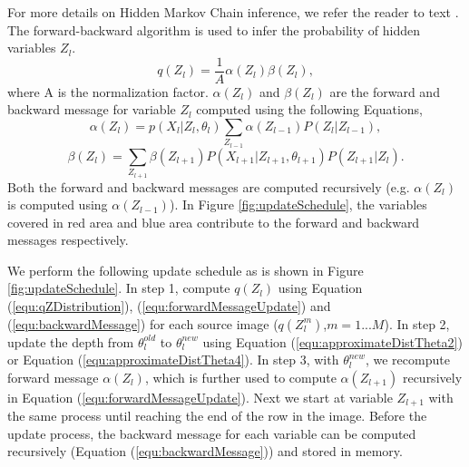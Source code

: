 For more details on Hidden Markov Chain inference, we refer the reader to text \cite{BishopBook}. The forward-backward algorithm is used to infer the probability of hidden variables $Z_l$.
\begin{equation}
q(Z_l) = \frac{1}{A}\alpha(Z_l)\beta(Z_l),
\label{equ:qZDistribution}
\end{equation}
where A is the normalization factor. $\alpha(Z_l)$ and $\beta(Z_l)$ are the forward and backward message for variable $Z_l$ computed using the following Equations,
\begin{equation}
\alpha(Z_l) = p(X_l|Z_l, \theta_l)\sum_{Z_{l-1}}{\alpha(Z_{l-1})P(Z_l|Z_{l-1})},
\label{equ:forwardMessageUpdate}
\end{equation}
\begin{equation}
\beta(Z_l)=\sum_{Z_{l+1}}\beta(Z_{l+1})P(X_{l+1}|Z_{l+1}, \theta_{l+1})P(Z_{l+1}|Z_{l}).
\label{equ:backwardMessage}
\end{equation}
Both the forward and backward messages are computed recursively (e.g.  $\alpha(Z_l)$ is computed using $\alpha(Z_{l-1})$). In Figure \ref{fig:updateSchedule}, the variables covered in red area and blue area contribute to the forward and backward messages respectively.

We perform the following update schedule as is shown in Figure \ref{fig:updateSchedule}. In step 1, compute $q(Z_l)$ using Equation (\ref{equ:qZDistribution}), (\ref{equ:forwardMessageUpdate}) and (\ref{equ:backwardMessage}) for each source image (\ie $q(Z_l^m)$,$m=1...M$). In step 2, update the depth from $\theta_l^{old}$ to $\theta_l^{new}$ using Equation (\ref{equ:approximateDistTheta2}) or Equation (\ref{equ:approximateDistTheta4}).
In step 3, with $\theta_l^{new}$, we recompute forward message $\alpha(Z_l)$, which is further used to compute $\alpha(Z_{l+1})$ recursively in Equation (\ref{equ:forwardMessageUpdate}). Next we start at variable $Z_{l+1}$ with the same process until reaching the end of the row in the image. Before the update process, the backward message for each variable can be computed recursively (Equation (\ref{equ:backwardMessage})) and stored in memory.




